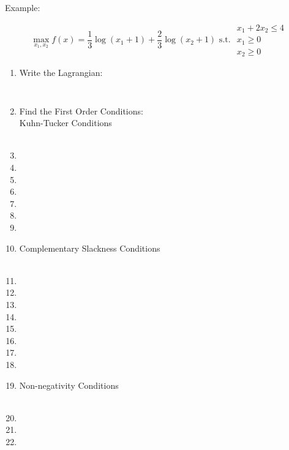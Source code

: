 \documentclass[]{book}
\theoremstyle{definition}
\theoremstyle{definition}
\theoremstyle{definition}
\theoremstyle{remark}
\begin{document}
Example:

\[\max_{x_1,x_2} f(x) = \frac{1}{3}\log (x_1 + 1) + \frac{2}{3}\log (x_2 + 1) \text{ s.t. }  
\begin{array}{l}
x_1 + 2x_2 \leq 4\\
     x_1 \geq 0\\
    x_2 \geq 0
\end{array}\]

\begin{enumerate}
\item Write the Lagrangian:
$$\phantom{L(x_1, x_2, \lambda) =  \frac{1}{3}\log(x_1+1) + \frac{2}{3}\log(x_2+1) - \lambda(x_1 + 2x_2 - 4)}$$

\item Find the First Order Conditions:\\
Kuhn-Tucker Conditions\\
\\
\item[]
\item[]
\item[]
\item[]
\item[]
\item[]
\item[]
\item[]
 
Complementary Slackness Conditions\\
\\
\item[]
\item[]
\item[]
\item[]
\item[]
\item[]
\item[]
\item[]
\item[]

Non-negativity Conditions\\
\phantom{$x_1  \geq  0$\\
$x_2  \geq  0$\\
$\lambda  \geq  $0}\\
\item[]
\item[]
\item[]


\end{enumerate}
\end{document}
